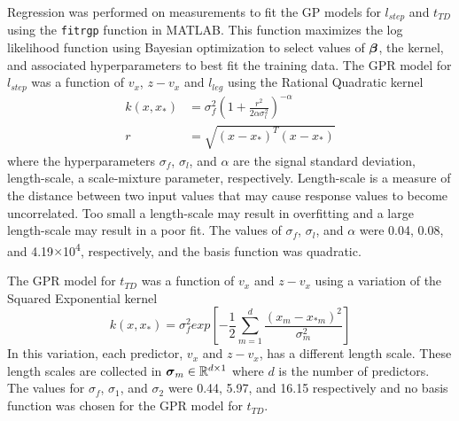 Regression was performed on measurements to fit the GP models for $ l_{step} $ and $ t_{TD} $ using the \texttt{fitrgp} function in  MATLAB. This function maximizes the log likelihood function using Bayesian optimization to select values of $ \boldsymbol{\beta} $, the kernel, and associated hyperparameters to best fit the training data. The GPR model for $ l_{step} $ was a function of $ v_x $, $ z-v_x $ and $ l_{leg} $ using the Rational Quadratic kernel 
\begin{align*}
	k(x,x_*) &= \sigma_f^2 \left( 1 + \frac{r^2}{2 \alpha \sigma_l^2}\right)^{-\alpha}\\
	r &= \sqrt{(x-x_*)^T(x-x_*)}
\end{align*}
where the hyperparameters $ \sigma_f $, $ \sigma_l $, and $ \alpha $ are the signal standard deviation, length-scale, a scale-mixture parameter, respectively. Length-scale is a measure of the distance between two input values that may cause response values to become uncorrelated. Too small a length-scale may result in overfitting and a large length-scale may result in a poor fit. The values of $ \sigma_f $, $ \sigma_l $, and $ \alpha $ were 0.04, 0.08, and 4.19$ \times $10\textsuperscript{4}, respectively, and the basis function was quadratic.

The GPR model for $ t_{TD} $ was a function of $ v_x $ and $ z-v_x $ using a variation of the Squared Exponential kernel  
\[
	k(x,x_*) = \sigma_f^2 exp\left[-\frac{1}{2} \displaystyle \sum_{m = 1}^{d} \frac{(x_m - x_{*m})^2}{\sigma_m^2} \right]
\]
In this variation, each predictor, $ v_x $ and $ z-v_x $, has a different length scale. These length scales are collected in $ \boldsymbol{\sigma}_m \in \mathbb{R}^{d \times 1}$ where $ d $ is the number of predictors. The values for $ \sigma_f $, $ \sigma_1 $, and $ \sigma_2 $ were 0.44, 5.97, and 16.15 respectively and no basis function was chosen for the GPR model for $ t_{TD} $.  
%
%

